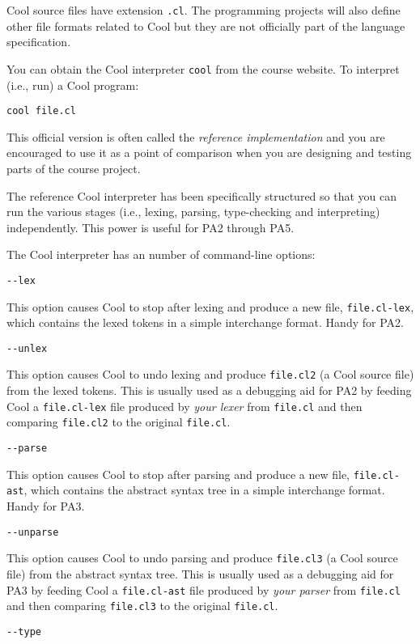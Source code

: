 \documentclass[]{article}
\begin{document}
Cool source files have extension \texttt{.cl}. The programming projects
will also define other file formats related to Cool but they are not
officially part of the language specification.

You can obtain the Cool interpreter \texttt{cool} from the course
website. To interpret (i.e., run) a Cool program:

\begin{verbatim}
cool file.cl 
\end{verbatim}

This official version is often called the \emph{reference
implementation} and you are encouraged to use it as a point of
comparison when you are designing and testing parts of the course
project.

The reference Cool interpreter has been specifically structured so that
you can run the various stages (i.e., lexing, parsing, type-checking and
interpreting) independently. This power is useful for PA2 through PA5.

The Cool interpreter has an number of command-line options:

\texttt{-{}-lex}

This option causes Cool to stop after lexing and produce a new file,
\texttt{file.cl-lex}, which contains the lexed tokens in a simple
interchange format. Handy for PA2.

\texttt{-{}-unlex}

This option causes Cool to undo lexing and produce \texttt{file.cl2} (a
Cool source file) from the lexed tokens. This is usually used as a
debugging aid for PA2 by feeding Cool a \texttt{file.cl-lex} file
produced by \emph{your lexer} from \texttt{file.cl} and then comparing
\texttt{file.cl2} to the original \texttt{file.cl}.

\texttt{-{}-parse}

This option causes Cool to stop after parsing and produce a new file,
\texttt{file.cl-ast}, which contains the abstract syntax tree in a
simple interchange format. Handy for PA3.

\texttt{-{}-unparse}

This option causes Cool to undo parsing and produce \texttt{file.cl3} (a
Cool source file) from the abstract syntax tree. This is usually used as
a debugging aid for PA3 by feeding Cool a \texttt{file.cl-ast} file
produced by \emph{your parser} from \texttt{file.cl} and then comparing
\texttt{file.cl3} to the original \texttt{file.cl}.

\texttt{-{}-type}
\end{document}
